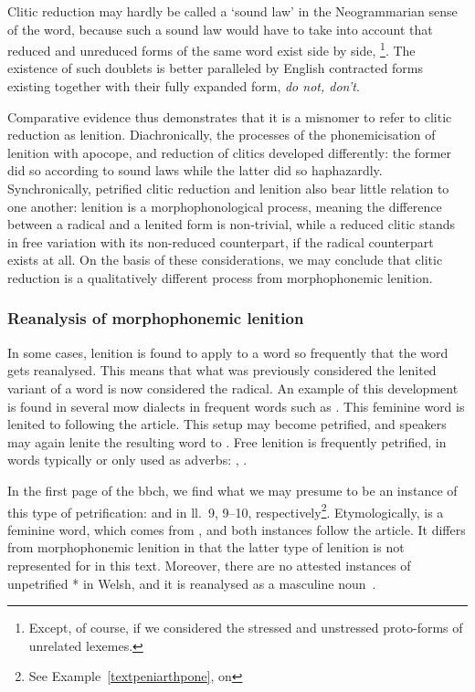 Clitic reduction may hardly be called a `sound law' in the Neogrammarian sense of the word, because such a sound law would have to take into account that reduced and unreduced forms of the same word  exist side by side, \eg {}\footnote{%
Except, of course, if we considered the stressed and unstressed proto-forms of  unrelated lexemes.
}.
The existence of such doublets is better paralleled by English contracted forms existing together with their fully expanded form, \eg \emph{do not, don't}.

Comparative evidence thus demonstrates that it is a misnomer to refer to clitic reduction as lenition.
Diachronically, the processes of the phonemicisation of lenition with apocope, and reduction of clitics developed differently: the former did so according to sound laws while the latter did so haphazardly.
Synchronically, petrified clitic reduction and lenition also bear little relation to one another: lenition is a morphophonological process, meaning the difference between a radical and a lenited form is non-trivial, while a reduced clitic stands in free variation with its non-reduced counterpart, if the radical counterpart exists at all. 
On the basis of these considerations, we may conclude that clitic reduction is a qualitatively different process from morphophonemic lenition. 

\subsubsection{Reanalysis of morphophonemic lenition}
\label{sec:rean-morph-lenit}
In some cases, lenition is found to apply to a word so frequently that the word gets reanalysed. 
This means that what was previously considered the lenited variant of a word is now considered the radical. 
An example of this development is found in several \gls{mow} dialects in frequent words such as . 
This feminine word is lenited to  following the article. 
This setup may become petrified, and speakers may again lenite the resulting word to .
Free lenition is frequently petrified, \eg in words typically or only used as adverbs: , .


In the first page of the \gls{bbch}, we find what we may presume to be an instance of this type of petrification:  and  in ll.~9, 9--10, respectively\footnote{See Example~\ref{textpeniarthpone}, on }. 
Etymologically,  is a feminine word, which comes from , and both instances follow the article. 
It differs from morphophonemic lenition in that the latter type of lenition is not represented for  in this text. 
Moreover, there are no attested instances of unpetrified * in Welsh, and it is reanalysed as a masculine noun~\autocite[Grawys, Garawys]{bevan_geiriadur_2014}. 


